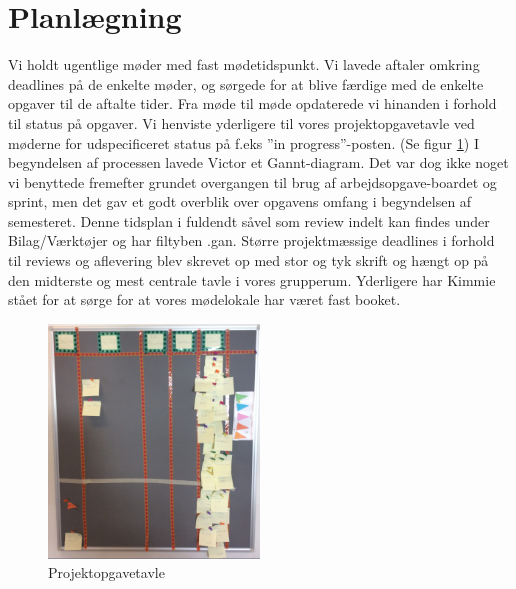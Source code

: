 \section{Planlægning}

Vi holdt ugentlige møder med fast mødetidspunkt. Vi lavede aftaler omkring deadlines på de enkelte møder, og sørgede for at blive færdige med de enkelte opgaver til de aftalte tider. Fra møde til møde opdaterede vi hinanden i forhold til status på opgaver. Vi henviste yderligere til vores projektopgavetavle ved møderne for udspecificeret status på f.eks ”in progress”-posten. (Se figur \ref{fig:SB})  
 I begyndelsen af processen lavede Victor et Gannt-diagram. Det var dog ikke noget vi benyttede fremefter grundet overgangen til brug af arbejdsopgave-boardet og sprint, men det gav et godt overblik over opgavens omfang i begyndelsen af semesteret. Denne tidsplan i fuldendt såvel som review indelt kan findes under Bilag/Værktøjer og har filtyben .gan. 
Større projektmæssige deadlines i forhold til reviews og aflevering blev skrevet op med stor og tyk skrift og hængt op på den midterste og mest centrale tavle i vores grupperum. 
Yderligere har Kimmie stået for at sørge for at vores mødelokale har været fast booket.

\begin{figure}[H] \centering
    \includegraphics[width=0.5\textwidth]{0_Filer/ScrumBoard.PNG}
    \caption{Projektopgavetavle}
    \label{fig:SB}
\end{figure}
